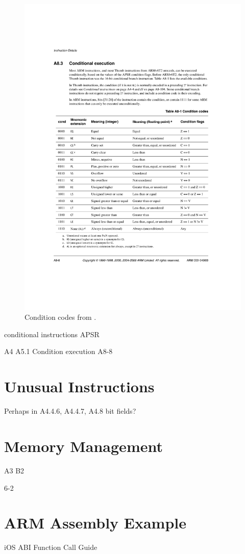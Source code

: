\documentclass[oneside,a4paper]{report}
\begin{document}
\begin{figure}[htb]
	\centering
	\includegraphics[width=1.0\textwidth]{./fig/ConditionCodes.pdf}
	\caption{Condition codes from \cite[p. A8-8]{ARMRef}.}
	\label{fig:conditioncodes}
\end{figure}

conditional instructions
APSR

A4
A5.1
Condition execution A8-8
\chapter{Unusual Instructions}
Perhaps in A4.4.6, A4.4.7, A4.8
bit fields?
\chapter{Memory Management}
A3
B2

6-2
\chapter{ARM Assembly Example}
iOS ABI Function Call Guide \cite{iOSABI}
\end{document}
